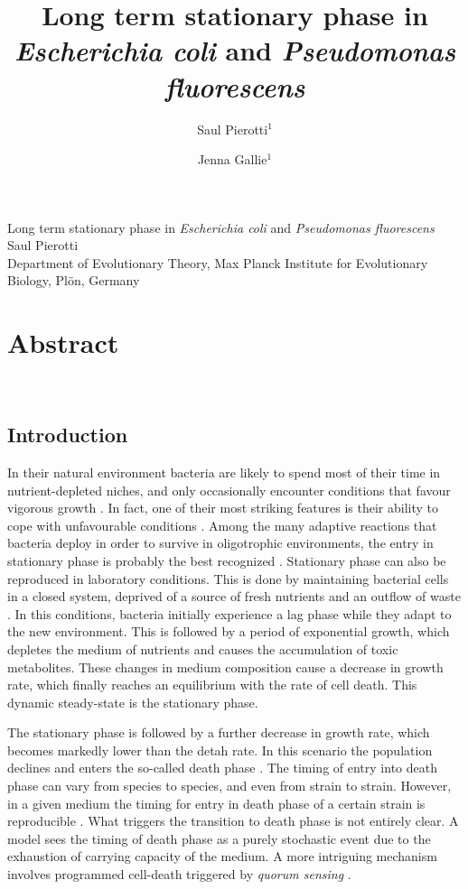 \documentclass[
	11pt,
	a4paper,
]{article} %
\author{Saul Pierotti$^1$ \and Jenna Gallie$^1$}
\title{Long term stationary phase in \textit{Escherichia coli} and \textit{Pseudomonas fluorescens}}
\begin{document}
\huge
Long term stationary phase in \textit{Escherichia coli} and \textit{Pseudomonas fluorescens}\\
[2 ex]
\large
Saul Pierotti\\
[1 ex]
\footnotesize
Department of Evolutionary Theory, Max Planck Institute for Evolutionary Biology, Pl{\"o}n, Germany
\normalsize

\section*{Abstract}
\textbf{%
\blindtext
}%
\\[5ex]

\begin{multicols}{2}

\section*{Introduction}
In their natural environment bacteria are likely to spend most of their time in nutrient-depleted niches, and only occasionally encounter conditions that favour vigorous growth \citep{Morita1997}.
In fact, one of their most striking features is their ability to cope with unfavourable conditions \citep{Ksiazek2010}.
Among the many adaptive reactions that bacteria deploy in order to survive in oligotrophic environments, the entry in stationary phase is probably the best recognized \citep{Kolter1993}.
Stationary phase can also be reproduced in laboratory conditions.
This is done by maintaining bacterial cells in a closed system, deprived of a source of fresh nutrients and an outflow of waste \citep{Ksiazek2010}.
In this conditions, bacteria initially experience a lag phase while they adapt to the new environment.
This is followed by a period of exponential growth, which depletes the medium of nutrients and causes the accumulation of toxic metabolites.
These changes in medium composition cause a decrease in growth rate, which finally reaches an equilibrium with the rate of cell death.
This dynamic steady-state is the stationary phase.

The stationary phase is followed by a further decrease in growth rate, which becomes markedly lower than the detah rate.
In this scenario the population declines and enters the so-called death phase \citep{Pommerville2004}.
The timing of entry into death phase can vary from species to species, and even from strain to strain.
However, in a given medium the timing for entry in death phase of a certain strain is reproducible \citep{Finkel2006}.
What triggers the transition to death phase is not entirely clear.
A model sees the timing of death phase as a purely stochastic event due to the exhaustion of carrying capacity of the medium.
A more intriguing mechanism involves programmed cell-death triggered by \textit{quorum sensing} \citep{Finkel2006}.


\end{multicols}
\end{document}
